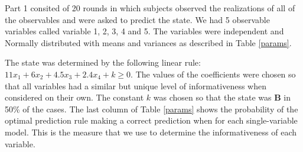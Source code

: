 \documentclass[
  12pt,
]{article}
\begin{document}
Part 1 consited of 20 rounds in which subjects observed the realizations
of all of the observables and were asked to predict the state. We had 5
observable variables called variable 1, 2, 3, 4 and 5. The variables
were independent and Normally distributed with means and variances as
described in Table \ref{params}.

The state was determined by the following linear rule:
\(11x_1+6x_2+4.5x_3+2.4x_4+k \geq 0\). The values of the coefficients
were chosen so that all variables had a similar but unique level of
informativeness when considered on their own. The constant \(k\) was
chosen so that the state was \textbf{B} in 50\% of the cases. The last
column of Table \ref{params} shows the probability of the optimal
prediction rule making a correct prediction when for each
single-variable model. This is the measure that we use to determine the
informativeness of each variable.
\end{document}
